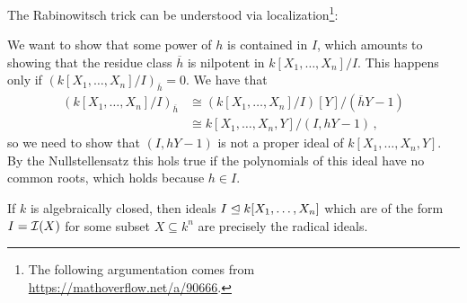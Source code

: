 \begin{remark}
  The Rabinowitsch trick can be understood via localization\footnote{
  The following argumentation comes from \url{https://mathoverflow.net/a/90666}.
  }:
  
  We want to show that some power of $h$ is contained in $I$, which amounts to showing that the residue class $\overline{h}$ is nilpotent in $k[X_1, \dotsc, X_n]/I$.
  This happens only if $(k[X_1, \dotsc, X_n]/I)_{\overline{h}} = 0$.
  We have that
  \begin{align*}
            (k[X_1, \dotsc, X_n]/I)_{\overline{h}}
    &\cong  (k[X_1, \dotsc, X_n]/I)[Y]/(\overline{h}Y - 1)  \\
    &\cong  k[X_1, \dotsc, X_n,Y]/(I, hY - 1) \,,
  \end{align*}
  so we need to show that $(I, hY - 1)$ is not a proper ideal of $k[X_1, \dotsc, X_n, Y]$.
  By the Nullstellensatz this hols true if the polynomials of this ideal have no common roots, which holds because $h \in I$.
\end{remark}


\begin{corollary}
  \label{corollary: vanishing ideals are precisely radical ideals}
  If $k$ is algebraically closed, then ideals $I \trianglelefteq k[X_1, \dotsc, X_n]$ which are of the form $I = \mathcal{I}(X)$ for some subset $X \subseteq k^n$ are precisely the radical ideals.
\end{corollary}




